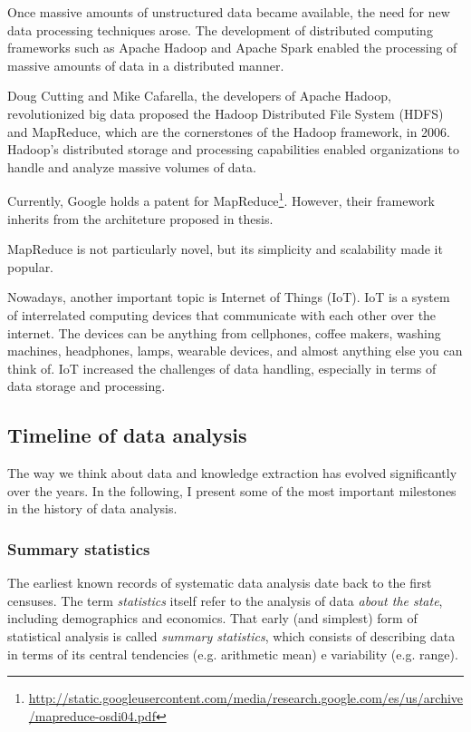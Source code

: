 Once massive amounts of unstructured data became available, the need for new data
processing techniques arose.  The development of distributed computing frameworks such as
Apache Hadoop and Apache Spark enabled the processing of massive amounts of data in a
distributed manner.

Doug Cutting and Mike Cafarella, the developers of Apache Hadoop, revolutionized big data
proposed the Hadoop Distributed File System (HDFS) and MapReduce, which are the
cornerstones of the Hadoop framework, in 2006.  Hadoop's distributed storage and
processing capabilities enabled organizations to handle and analyze massive volumes of
data.

Currently, Google holds a patent for
MapReduce\footnote{\url{http://static.googleusercontent.com/media/research.google.com/es/us/archive/mapreduce-osdi04.pdf}}.
However, their framework inherits from the architeture proposed in \textcite{Hillis1985}
thesis.

MapReduce is not particularly novel, but its simplicity and scalability made it popular.

Nowadays, another important topic is Internet of Things (IoT).  IoT is a system of
interrelated computing devices that communicate with each other over the internet.
The devices can be anything from cellphones, coffee makers, washing machines, headphones,
lamps, wearable devices, and almost anything else you can think of.  IoT increased the
challenges of data handling, especially in terms of data storage and processing.

\subsection{Timeline of data analysis}

The way we think about data and knowledge extraction has evolved significantly over the
years.  In the following, I present some of the most important milestones in the history
of data analysis.

\subsubsection{Summary statistics}

The earliest known records of systematic data analysis date back to the first censuses.
The term \emph{statistics} itself refer to the analysis of data \emph{about the state},
including demographics and economics.  That early (and simplest) form of statistical
analysis is called \emph{summary statistics}, which consists of describing data in terms
of its central tendencies (e.g. arithmetic mean) e variability (e.g. range).

